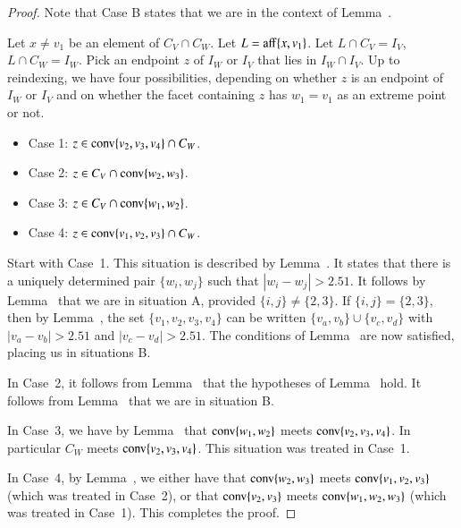 \begin{proof}  Note that Case B states that we are in the context
of Lemma~.

Let $x\ne v_1$ be an element of $C_V\cap C_W$.  Let $L={\operatorname{aff}}\{x,v_1\}$.
Let $L\cap C_V = I_V$, $L\cap C_W = I_W$.  Pick an endpoint $z$ of $I_W$
or $I_V$ that lies in $I_W\cap I_V$.  
Up to reindexing, we have four possibilities, depending on whether
$z$ is an endpoint of $I_W$ or $I_V$ and on whether the facet containing
$z$ has $w_1=v_1$ as an extreme point or not.
\begin{itemize}
  \item Case 1: $z\in {\operatorname{conv}}\{v_2,v_3,v_4\}\cap C_W$.
  \item Case 2: $z\in C_V \cap {\operatorname{conv}}\{w_2,w_3\}$.
  \item Case 3: $z\in C_V \cap {\operatorname{conv}}\{w_1,w_2\}$.
  \item Case 4: $z\in {\operatorname{conv}}\{v_1,v_2,v_3\}\cap C_W$.
\end{itemize}
Start with Case~1.  This situation is described by 
Lemma~.  It states that there is a uniquely
determined pair $\{w_i,w_j\}$ such that $|w_i-w_j|>2.51$.
It follows by Lemma~
that we are in situation A, provided $\{i,j\}\ne\{2,3\}$.
If $\{i,j\}=\{2,3\}$,  then by Lemma~, the
set $\{v_1,v_2,v_3,v_4\}$ can be written $\{v_a,v_b\}\cup \{v_c,v_d\}$
with $|v_a-v_b|>2.51$ and $|v_c-v_d|>2.51$.  The conditions of
Lemma~ are now satisfied, placing us in
situations B.

In Case~2, it follows from Lemma~ that
the hypotheses of Lemma~ hold.  It follows
from Lemma~ that we are in situation B.

In Case~3, we have by Lemma~ that ${\operatorname{conv}}\{w_1,w_2\}$
meets ${\operatorname{conv}}\{v_2,v_3,v_4\}$. In particular $C_W$ meets
${\operatorname{conv}}\{v_2,v_3,v_4\}$.  This situation was treated in Case~1.

In Case~4, by Lemma~, we either have that ${\operatorname{conv}}\{w_2,w_3\}$
meets ${\operatorname{conv}}\{v_1,v_2,v_3\}$ (which was treated in Case~2),
or that ${\operatorname{conv}}\{v_2,v_3\}$ meets ${\operatorname{conv}}\{w_1,w_2,w_3\}$
(which was treated in Case~1).  This completes the proof.
\end{proof}

\newpage

